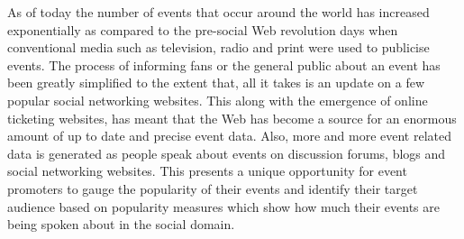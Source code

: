 \documentclass[10pt,a4paper]{article}
\begin{document}
As of today the number of events that occur around the world has increased exponentially as compared to the pre-social Web revolution days when conventional media such as television, radio and print were used to
publicise events. The process of informing fans or the general public about an event has been greatly simplified to the extent that, all it takes is an update on a few popular social networking websites. This along with the emergence of online ticketing websites, has meant that the Web has become a source for an enormous amount of up to date and precise event data. Also, more and more event related data is generated as people speak about events on discussion forums, blogs and social networking websites. This presents a unique opportunity for event promoters to gauge the popularity of their events and identify their target audience based on popularity measures which show how much their events are being spoken about in the social domain.



\end{document}
